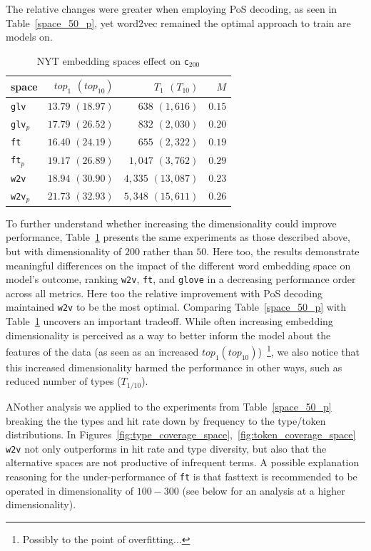 \documentclass[11pt,a4paper]{article}
\begin{document}
The relative changes were greater when employing PoS decoding, as seen in Table~\ref{space_50_p}, yet word2vec remained the optimal approach to train are models on. 


\begin{table}[h]
\begin{center}
\begin{tabular}{lrrr}
space &  $top_{1}$ $(top_{10})$ & $T_{1}$ $(T_{10})$ & $M$ \\ \hline
{\tt glv} & $13.79$ $(18.97)$ & $638$ $(1,616)$ & $0.15$   \\
{\tt glv}$_{p}$ & $17.79$ $(26.52)$ & $832$ $(2,030)$ & $0.20$\\
{\tt ft} & $16.40$ $(24.19)$ & $655$ $(2,322)$ & $0.19$\\
{\tt ft}$_{p}$ & $19.17$ $(26.89)$ & $1,047$ $(3,762)$ & $0.29$\\
{\tt w2v} & $18.94$ $(30.90)$ & $4,335$ $(13,087)$ & $0.23$  \\
{\tt w2v}$_{p}$ & $21.73$ $(32.93)$ & $5,348$ $(15,611)$ & $0.26$ \\
\end{tabular}
\end{center}
\vspace{-0.1in}
\caption{\label{space_200}{NYT embedding spaces effect on {\tt c$_{200}$}}}
\end{table}

To further understand whether increasing the dimensionality could improve performance, Table~\ref{space_200} presents the same experiments as those described above, but with dimensionality of $200$ rather than $50$. Here too, the results demonstrate meaningful differences on the impact of the different word embedding space on model's outcome, ranking {\tt w2v}, {\tt ft}, and {\tt glove} in a decreasing performance order across all metrics.  Here too the relative improvement with PoS decoding maintained  {\tt w2v} to be the most optimal. Comparing Table~\ref{space_50_p} with Table~\ref{space_200} uncovers an important tradeoff. While often increasing embedding dimensionality is perceived as a way to better inform the model about the features of the data (as seen as an increased $top_{1}(top_{10})$)~\footnote{Possibly to the point of overfitting...}, we also notice that this increased dimensionality harmed the performance in other ways, such as reduced number of types ($T_{1/10}$).

ANother analysis we applied to the experiments from Table~\ref{space_50_p} breaking the the types and hit rate down by frequency to the type/token distributions. In Figures~\ref{fig:type_coverage_space},~\ref{fig:token_coverage_space} {\tt w2v} not only outperforms in hit rate and type diversity, but also that the alternative spaces are not productive of infrequent terms. A possible explanation reasoning for the under-performance of {\tt ft} is that fasttext is recommended to be operated in dimensionality of $100-300$ (see below for an analysis at a higher dimensionality). 
\end{document}
